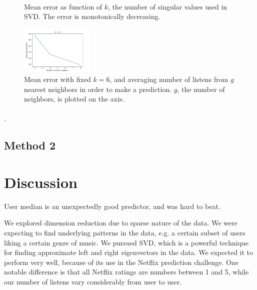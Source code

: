 \documentclass[11pt]{article}
\begin{document}
\begin{figure}[]
\begin{subfigure}[!t]{0.31\textwidth}
    \end{subfigure}\\
        \caption{Mean error as function of $k$, the number of singular values used in SVD. The error is monotonically decreasing.}
            \label{SVD_k}
\end{figure}


\begin{figure}[] 
\centering
        \includegraphics[width=0.31\textwidth]{Plots/SVD_group_8.png}
        \caption{Mean error with fixed $k=6$, and averaging number of listens from $g$ nearest neighbors in order to make a prediction. $g$, the number of neighbors, is plotted on the axis.}
            \label{SVD_g}
\end{figure}


\paragraph{}.
\subsection{Method 2}
\paragraph{}

\section{Discussion} 

User median is an unexpectedly good predictor, and was hard to beat.

We explored dimension reduction due to sparse nature of the data. We were expecting to find underlying patterns in the data, e.g. a certain subset of users liking a certain genre of music. We pursued SVD, which is a powerful technique for finding approximate left and right eigenvectors in the data. We expected it to perform very well, because of its use in the Netflix prediction challenge. One notable difference is that all Netflix ratings are numbers between 1 and 5, while our number of listens vary considerably from user to user. 
\end{document}
